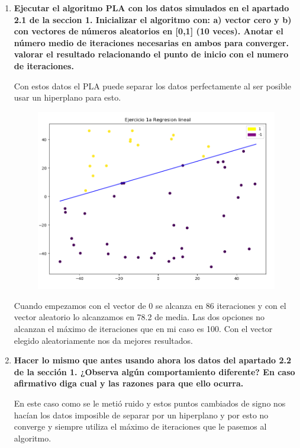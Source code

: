 \documentclass[titlepage]{article}
\begin{document}
	\begin{enumerate}
		\item 
		\textbf{Ejecutar el algoritmo PLA con los datos simulados en el apartado 2.1 de la seccion 1. Inicializar el algoritmo con: a) vector cero y b) con vectores de números aleatorios en [0,1] (10 veces). Anotar el número medio de iteraciones necesarias en ambos para converger. valorar el resultado relacionando el punto de inicio con el numero de iteraciones.}
		\newline
		
		Con estos datos el PLA puede separar los datos perfectamente al ser posible usar un hiperplano para esto.
		\begin{figure}[h]
			\centering
			\includegraphics[width=0.7\linewidth]{screenshot010}
			\caption{}
			\label{fig:screenshot010}
		\end{figure}
		
		Cuando empezamos con el vector de 0 se alcanza en 86 iteraciones y con el vector aleatorio lo alcanzamos en 78.2 de media. Las dos opciones no alcanzan el máximo de iteraciones que en mi caso es 100. Con el vector elegido aleatoriamente nos da mejores resultados.
		
		
		\item 
		\textbf{Hacer lo mismo que antes usando ahora los datos del apartado 2.2 de la sección 1. ¿Observa algún comportamiento diferente? En caso afirmativo diga cual y las razones para que ello ocurra.}
		\newline
		
		En este caso como se le metió ruido y estos puntos cambiados de signo nos hacían los datos imposible de separar por un hiperplano y por esto no converge y siempre utiliza el máximo de iteraciones que le pasemos al algoritmo.
		

\end{enumerate}
\end{document}
